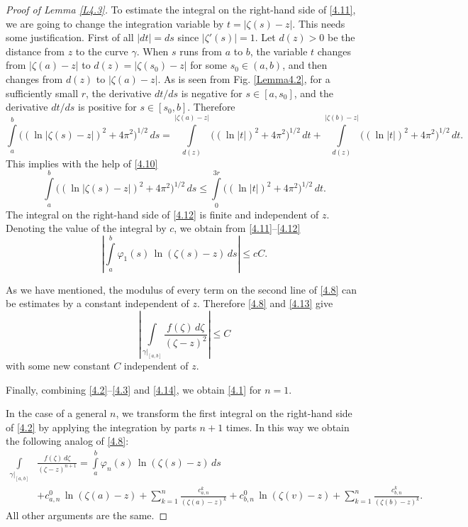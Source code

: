 \documentclass[12pt,reqno]{amsart}
\begin{document}
\begin{proof}[Proof of Lemma \ref{L4.3}]
To estimate the integral on the right-hand side of \eqref{4.11}, we are going to change the integration variable by $t=|\zeta(s)-z|$. This needs some justification. First of all $|dt|=ds$ since $|\zeta'(s)|=1$. Let $d(z)>0$ be the distance from $z$ to the curve $\gamma$. When $s$ runs from $a$ to $b$, the variable $t$ changes from $|\zeta(a)-z|$ to $d(z)=|\zeta(s_0)-z|$ for some $s_0\in(a,b)$, and then changes from $d(z)$ to $|\zeta(a)-z|$. As is seen from Fig. \ref{Lemma4.2}, for a sufficiently small $r$, the derivative $dt/ds$ is negative for $s\in[a,s_0]$, and the derivative $dt/ds$ is positive for $s\in[s_0,b]$. Therefore
$$
\int\limits_a^b \Big((\ln|\zeta(s)-z|)^2+4\pi^2\Big)^{1/2}\,ds
=\int\limits_{d(z)}^{|\zeta(a)-z|} \Big((\ln|t|)^2+4\pi^2\Big)^{1/2}\,dt
+\int\limits_{d(z)}^{|\zeta(b)-z|} \Big((\ln|t|)^2+4\pi^2\Big)^{1/2}\,dt.
$$
This implies with the help of \eqref{4.10}
\begin{equation}
\int\limits_a^b \Big((\ln|\zeta(s)-z|)^2+4\pi^2\Big)^{1/2}\,ds
\le\int\limits_0^{3r} \Big((\ln|t|)^2+4\pi^2\Big)^{1/2}\,dt.
                                \label{4.12}
\end{equation}
The integral on the right-hand side of \eqref{4.12} is finite and independent of $z$. Denoting the value of the integral by $c$, we obtain from \eqref{4.11}--\eqref{4.12}
\begin{equation}
\left|\int\limits_a^b \varphi_1(s)\,\ln(\zeta(s)-z)\,ds\right|\le cC.
                                \label{4.13}
\end{equation}

As we have mentioned, the modulus of every term on the second line of \eqref{4.8} can be estimates by a constant independent of $z$. Therefore \eqref{4.8} and \eqref{4.13} give
\begin{equation}
\left|\int\limits_{\gamma|_{[a,b]}}\frac{f(\zeta)\,d\zeta}{(\zeta-z)^2}\right|\le C
                                \label{4.14}
\end{equation}
with some new constant $C$ independent of $z$.

Finally, combining \eqref{4.2}--\eqref{4.3} and \eqref{4.14}, we obtain \eqref{4.1} for $n=1$.

In the case of a general $n$, we transform the first integral on the right-hand side of \eqref{4.2} by applying the integration by parts $n+1$ times. In this way we obtain the following analog of \eqref{4.8}:
$$
\begin{aligned}
\int\limits_{\gamma|_{[a,b]}}&\frac{f(\zeta)\,d\zeta}{(\zeta-z)^{n+1}}
=\int\limits_a^b \varphi_n(s)\,\ln(\zeta(s)-z)\,ds\\
&+c_{a,n}^0\,\ln(\zeta(a)-z)+\sum\limits_{k=1}^n\frac{c_{a,n}^k}{(\zeta(a)-z)^k}+c_{b,n}^0\,\ln(\zeta(v)-z)
+\sum\limits_{k=1}^n\frac{c_{b,n}^k}{(\zeta(b)-z)^k}.
\end{aligned}
$$
All other arguments are the same.
\end{proof}
\end{document}

